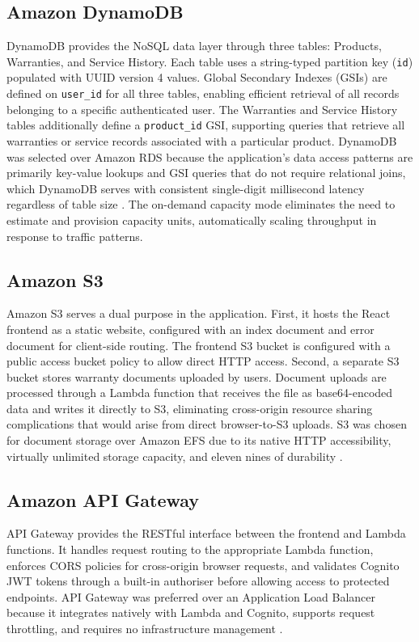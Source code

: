 \documentclass[conference]{IEEEtran}
\begin{document}
\subsection{Amazon DynamoDB}

DynamoDB provides the NoSQL data layer through three tables: Products, Warranties, and Service History. Each table uses a string-typed partition key (\texttt{id}) populated with UUID version 4 values. Global Secondary Indexes (GSIs) are defined on \texttt{user\_id} for all three tables, enabling efficient retrieval of all records belonging to a specific authenticated user. The Warranties and Service History tables additionally define a \texttt{product\_id} GSI, supporting queries that retrieve all warranties or service records associated with a particular product. DynamoDB was selected over Amazon RDS because the application's data access patterns are primarily key-value lookups and GSI queries that do not require relational joins, which DynamoDB serves with consistent single-digit millisecond latency regardless of table size \cite{decandia2007dynamo}. The on-demand capacity mode eliminates the need to estimate and provision capacity units, automatically scaling throughput in response to traffic patterns.

\subsection{Amazon S3}

Amazon S3 serves a dual purpose in the application. First, it hosts the React frontend as a static website, configured with an index document and error document for client-side routing. The frontend S3 bucket is configured with a public access bucket policy to allow direct HTTP access. Second, a separate S3 bucket stores warranty documents uploaded by users. Document uploads are processed through a Lambda function that receives the file as base64-encoded data and writes it directly to S3, eliminating cross-origin resource sharing complications that would arise from direct browser-to-S3 uploads. S3 was chosen for document storage over Amazon EFS due to its native HTTP accessibility, virtually unlimited storage capacity, and eleven nines of durability \cite{awss3docs}.

\subsection{Amazon API Gateway}

API Gateway provides the RESTful interface between the frontend and Lambda functions. It handles request routing to the appropriate Lambda function, enforces CORS policies for cross-origin browser requests, and validates Cognito JWT tokens through a built-in authoriser before allowing access to protected endpoints. API Gateway was preferred over an Application Load Balancer because it integrates natively with Lambda and Cognito, supports request throttling, and requires no infrastructure management \cite{richardson2018microservices}.
\end{document}
